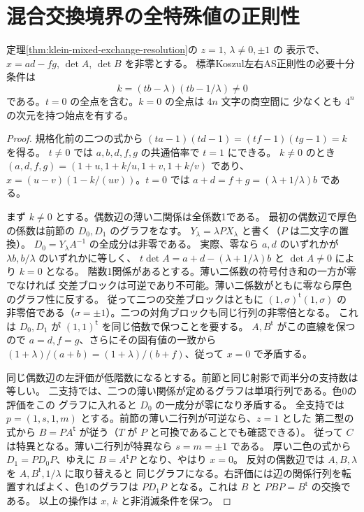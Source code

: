 \section{混合交換境界の全特殊値の正則性}
\label{sec:mixed-exchange-regularity}
\begin{theorem}\label{thm:mixed-exchange-regularity}
定理\ref{thm:klein-mixed-exchange-resolution}の $z=1$, $\lambda\ne0,\pm1$ の
表示で、$x=ad-fg$, $\det A$, $\det B$ を非零とする。
標準Koszul左右AS正則性の必要十分条件は
\[
                 k=(tb-\lambda)(tb-1/\lambda)\ne0
\]
である。$t=0$ の全点を含む。$k=0$ の全点は $4n$ 文字の商空間に
少なくとも $4^n$ の次元を持つ始点を有する。
\end{theorem}
\begin{proof}
規格化前の二つの式から
$(ta-1)(td-1)=(tf-1)(tg-1)=k$ を得る。
$t\ne0$ では $a,b,d,f,g$ の共通倍率で $t=1$ にできる。
$k\ne0$ のとき $(a,d,f,g)=(1+u,1+k/u,1+v,1+k/v)$ であり、
$x=(u-v)(1-k/(uv))$。$t=0$ では $a+d=f+g=(\lambda+1/\lambda)b$ である。

まず $k\ne0$ とする。偶数辺の薄い二関係は全係数1である。
最初の偶数辺で厚色の係数は前節の $D_0,D_1$ のグラフをなす。
$Y_\lambda=\lambda P X_\lambda$ と書く（$P$ は二文字の置換）。
$D_0=Y_\lambda A^{-1}$ の全成分は非零である。
実際、零なら $a,d$ のいずれかが $\lambda b,b/\lambda$ のいずれかに等しく、
$t\det A=a+d-(\lambda+1/\lambda)b$ と $\det A\ne0$ により $k=0$ となる。
階数1関係があるとする。薄い二係数の符号付き和の一方が零でなければ
交差ブロックは可逆であり不可能。薄い二係数がともに零なら厚色のグラフ性に反する。
従って二つの交差ブロックはともに $(1,\sigma)^{\mathsf t}(1,\sigma)$ の
非零倍である（$\sigma=\pm1$）。二つの対角ブロックも同じ行列の非零倍となる。
これは $D_0,D_1$ が $(1,1)^{\mathsf t}$ を同じ倍数で保つことを要する。
$A,B^{\mathsf t}$ がこの直線を保つので $a=d,f=g$、さらにその固有値の一致から
$(1+\lambda)/(a+b)=(1+\lambda)/(b+f)$、従って $x=0$ で矛盾する。

同じ偶数辺の左評価が低階数になるとする。前節と同じ射影で両半分の支持数は等しい。
二支持では、二つの薄い関係が定めるグラフは単項行列である。色0の評価をこの
グラフに入れると $D_0$ の一成分が零になり矛盾する。
全支持では $p=(1,s,1,m)$ とする。前節の薄い二行列が可逆なら、$z=1$ とした
第二型の式から $B=PA^{\mathsf t}$ が従う（$T$ が $P$ と可換であることでも確認できる）。
従って $C$ は特異となる。薄い二行列が特異なら $s=m=\pm1$ である。
厚い二色の式から $D_1=PD_0P$、ゆえに $B=A^{\mathsf t}P$ となり、やはり $x=0$。
反対の偶数辺では $A,B,\lambda$ を $A,B^{\mathsf t},1/\lambda$ に取り替えると
同じグラフになる。右評価には辺の関係行列を転置すればよく、色1のグラフは
$PD_1P$ となる。これは $B$ と $PBP=B^{\mathsf t}$ の交換である。
以上の操作は $x$, $k$ と非消滅条件を保つ。


\end{proof}
